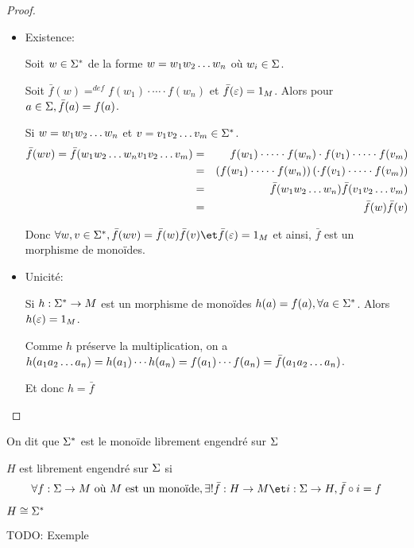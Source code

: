 \begin{proof}
	\begin{itemize}
		\item Existence:

		      Soit $w\in \Sigma^{*}$ de la forme $w = w_1 w_2 \ldots w_{n}$ où $w_i \in \Sigma$.

		      Soit $\bar f (w) =^{def} f(w_1) \cdot \cdots \cdot f(w_n)$ et $\bar f (\varepsilon) = 1_M$. Alors pour $a\in \Sigma, \bar f (a) = f (a)$.
		      
			  Si $w = w_1 w_2 \ldots w_{n}$ et $v = v_1 v_2 \ldots v_{m} \in \Sigma^{*}$.
		      \begin{eqnarray*}
			      \bar f(wv) = \bar f(w_1 w_2 \ldots w_{n} v_1 v_2 \ldots v_{m}) &=& f(w_1) \cdot \cdots \cdot f(w_n) \cdot f(v_1) \cdot \cdots \cdot f(v_m) \\
			      &=& \left( f(w_1) \cdot \cdots \cdot f(w_n)\right)\left( \cdot f(v_1) \cdot \cdots \cdot f(v_m) \right)\\
			      &=& \bar f(w_1 w_2 \ldots w_{n}) \bar f (v_1 v_2 \ldots v_{m}) \\
			      &=& \bar f(w) \bar f (v)
		      \end{eqnarray*}

		      Donc $\forall w, v \in \mots, \bar f (wv) = \bar f (w)\bar f(v) \et \bar f (\motvide) = 1_M$ et ainsi, $\bar f$ est un morphisme de monoïdes.


		\item Unicité:

		      Si $h : \Sigma^{*} \to M$ est un morphisme de monoïdes \tq $h(a) = f(a), \forall a \in \Sigma^{*}$. Alors $h(\varepsilon) = 1_M$.

		      Comme $h$ préserve la multiplication, on a
		      $h (a_1 a_2 \ldots a_{n}) = h(a_1) \cdots h(a_n) = f(a_1) \cdots f(a_n) = \bar f (a_1 a_2 \ldots a_{n})$.

		      Et donc $h = \bar f$
	\end{itemize}
\end{proof}

On dit que $\Sigma^{*}$ est le monoïde librement engendré sur $\Sigma$

\begin{definition}
	$H$ est librement engendré sur $\Sigma$ si
	$$\forall f : \alphabet \to M \text{ où } M  \text { est un monoïde}, \exists ! \bar f : H \to M \et i : \alphabet \to H, \bar f \circ i   = f $$

	$ H \cong \Sigma^{*}$
\end{definition}

\begin{exemple}
	TODO: Exemple
\end{exemple}

